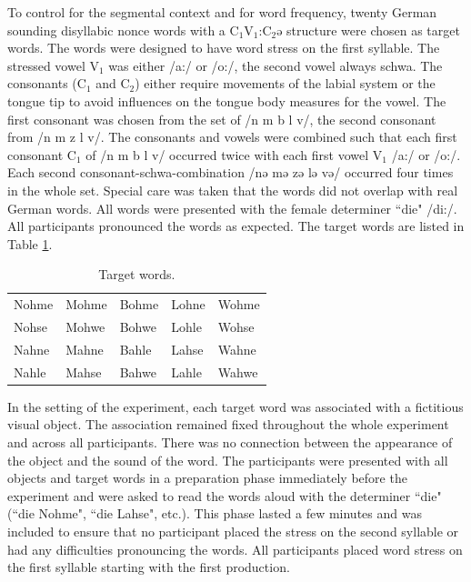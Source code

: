 To control for the segmental context and for word frequency, twenty German sounding disyllabic nonce words with a C$_1$V$_1$:C$_2$ǝ structure were chosen as target words. The words were designed to have word stress on the first syllable. The stressed vowel V$_1$ was either /a:/ or /o:/, the second vowel always schwa. The consonants (C$_1$ and C$_2$) either require movements of the labial system or the tongue tip to avoid influences on the tongue body measures for the vowel. The first consonant was chosen from the set of /n m b l v/, the second consonant from /n m z l v/. The consonants and vowels were combined such that each first consonant C$_1$ of /n m b l v/ occurred twice with each first vowel V$_1$ /a:/ or /o:/. Each second consonant-schwa-combination /nǝ mǝ zǝ lǝ vǝ/ occurred four times in the whole set. Special care was taken that the words did not overlap with real German words. All words were presented with the female determiner ``die" /di:/. All participants pronounced the words as expected. The target words are listed in Table \ref{tab:target_words}.

\begin{table}[htp]
\caption{Target words.}
\begin{center}
\begin{tabular}{lllll}
Nohme & Mohme & Bohme & Lohne & Wohme \\ 
Nohse & Mohwe & Bohwe & Lohle & Wohse \\ 
Nahne & Mahne & Bahle & Lahse & Wahne \\ 
Nahle & Mahse & Bahwe & Lahle & Wahwe
\end{tabular}
\end{center}
\label{tab:target_words}
\end{table}

In the setting of the experiment, each target word was associated with a fictitious visual object. The association remained fixed throughout the whole experiment and across all participants. There was no connection between the appearance of the object and the sound of the word. The participants were presented with all objects and target words in a preparation phase immediately before the experiment and were asked to read the words aloud with the determiner ``die" (``die Nohme", ``die Lahse", etc.). This phase lasted a few minutes and was included to ensure that no participant placed the stress on the second syllable or had any difficulties pronouncing the words. All participants placed word stress on the first syllable starting with the first production.

